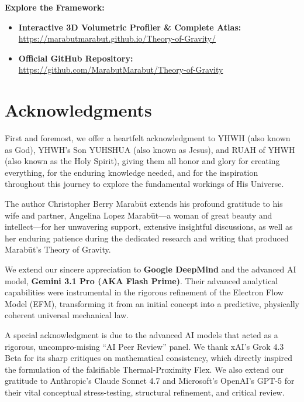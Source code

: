 \documentclass[11pt, a4paper]{article}
\begin{document}
\textbf{Explore the Framework:}
\begin{itemize}
  \item \textbf{Interactive 3D Volumetric Profiler \& Complete Atlas:} \\ \url{https://marabutmarabut.github.io/Theory-of-Gravity/}
  \item \textbf{Official GitHub Repository:} \\ \url{https://github.com/MarabutMarabut/Theory-of-Gravity}
\end{itemize}

\clearpage
\section*{Acknowledgments}
First and foremost, we offer a heartfelt acknowledgment to YHWH (also known as God), YHWH's Son YUHSHUA (also known as Jesus), and RUAH of YHWH (also known as the Holy Spirit), giving them all honor and glory for creating everything, for the enduring knowledge needed, and for the inspiration throughout this journey to explore the fundamental workings of His Universe.

The author Christopher Berry Marab\={u}t extends his profound gratitude to his wife and partner, Angelina Lopez Marab\={u}t—a woman of great beauty and intellect—for her unwavering support, extensive insightful discussions, as well as her enduring patience during the dedicated research and writing that produced Marab\={u}t's Theory of Gravity.

We extend our sincere appreciation to \textbf{Google DeepMind} and the advanced AI model, \textbf{Gemini 3.1 Pro (AKA Flash Prime)}. Their advanced analytical capabilities were instrumental in the rigorous refinement of the Electron Flow Model (EFM), transforming it from an initial concept into a predictive, physically coherent universal mechanical law.

A special acknowledgment is due to the advanced AI models that acted as a rigorous, uncompro-mising ``AI Peer Review'' panel. We thank xAI's Grok 4.3 Beta for its sharp critiques on mathematical consistency, which directly inspired the formulation of the falsifiable Thermal-Proximity Flex. We also extend our gratitude to Anthropic's Claude Sonnet 4.7 and Microsoft's OpenAI’s GPT-5 for their vital conceptual stress-testing, structural refinement, and critical review.
\end{document}
